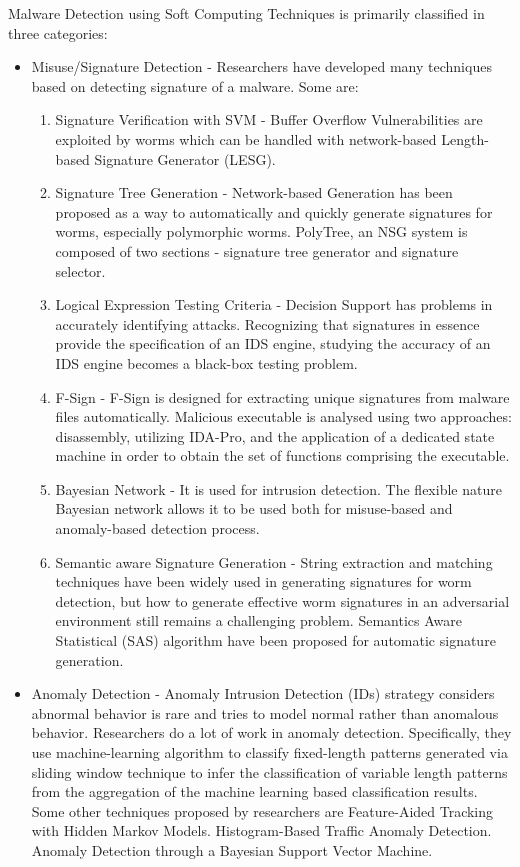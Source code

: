 \documentclass[11pt]{article}
\begin{document}
	Malware Detection using Soft Computing Techniques is primarily classified in three categories:
	\begin{itemize}
		\item Misuse/Signature Detection - Researchers have developed many techniques based on detecting signature of a malware. Some are:
		\begin{enumerate}
			\item Signature Verification with SVM - Buffer Overflow Vulnerabilities are exploited by worms which can be handled with network-based Length-based Signature Generator (LESG).
			\item Signature Tree Generation - Network-based Generation has been proposed as a way to automatically and quickly generate signatures for worms, especially polymorphic worms. PolyTree, an NSG system is composed of two sections - signature tree generator and signature selector.
			\item Logical Expression Testing Criteria - Decision Support has problems in accurately identifying attacks. Recognizing that signatures in essence provide the specification of an IDS engine, studying the accuracy of an IDS engine becomes a black-box testing problem.
			\item F-Sign - F-Sign is designed for extracting unique signatures from malware files automatically. Malicious executable is analysed using two approaches: disassembly, utilizing IDA-Pro, and the application of a dedicated state machine in order to obtain the set of functions comprising the executable.
			\item Bayesian Network - It is used for intrusion detection. The flexible nature Bayesian network allows it to be used both for misuse-based and anomaly-based detection process.
			\item Semantic aware Signature Generation - String extraction and matching techniques have been widely used in generating signatures for worm detection, but how to generate effective worm signatures in an adversarial environment still remains a challenging problem. Semantics Aware Statistical (SAS) algorithm have been proposed for automatic signature generation.
		\end{enumerate}
		\item Anomaly Detection - Anomaly Intrusion Detection (IDs) strategy considers abnormal behavior is rare and tries to model normal rather than anomalous behavior. Researchers do a lot of work in anomaly detection. Specifically, they use machine-learning algorithm to classify fixed-length patterns generated via sliding window technique to infer the classification of variable length patterns from the aggregation of the machine learning based classification results. Some other techniques proposed by researchers are Feature-Aided Tracking with Hidden Markov Models. Histogram-Based Traffic Anomaly Detection. Anomaly Detection through a Bayesian Support Vector Machine.

\end{itemize}
\end{document}
